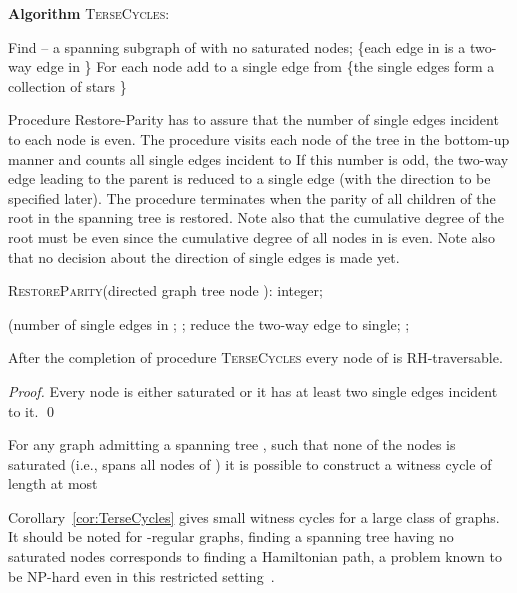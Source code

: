 \documentclass[11pt,envcountsame,oribibl]{llncs}
\begin{document}
\smallskip\smallskip\smallskip
\noindent
{\bf Algorithm} \textsc{TerseCycles}:
\begin{algorithmic}[1]
\STATE Find  -- a spanning subgraph of  with no saturated nodes;
\STATE  \{each edge in  is a two-way edge
in \}
\STATE For each node  add to  a
single edge from  \{the single edges form a collection of stars \}
\end{algorithmic}

\vspace*{0.2cm}
Procedure {\sc Restore-Parity}  has to assure that the number of single edges incident
to each node is even. The procedure visits each node  of the tree  in the bottom-up
manner and counts all single edges incident to  If this number is odd, the two-way edge
leading to the parent is reduced to a single edge (with the direction to be specified
later). The procedure terminates when the parity of all children of the root
in the spanning tree is restored. Note also that the cumulative degree of the
root must be even since
the cumulative degree of all nodes in  is even. Note also that no decision about
the direction of single edges is made yet.


\bigskip{}
\textsc{RestoreParity}(directed graph  tree  node ): integer;
\begin{algorithmic}[1]
\STATE  (number of single edges in ;
\STATE ;
\ENDFOR
\ENDIF
\IF {}
\STATE  reduce the two-way edge  to single;
\ENDIF
{} ;
\end{algorithmic}


\begin{lemma}
After the completion of procedure \textsc{TerseCycles}
every node of  is RH-traversable.
\end{lemma}
\begin{proof}
Every node is either saturated or it has at least
two single edges
incident to it. \qed
\end{proof}

\begin{corollary}\label{cor:TerseCycles}
For any graph  admitting a spanning tree , such that none of the nodes
is saturated (i.e.,  spans all nodes of ) it is
possible to construct a witness cycle of length at most 
\end{corollary}


Corollary~\ref{cor:TerseCycles} gives small witness cycles for a large class of graphs.
It should be noted for -regular graphs, finding a spanning tree having no
saturated nodes corresponds to finding a Hamiltonian path, a problem known to be
NP-hard even in this restricted setting~\cite{Garey}.
\end{document}
